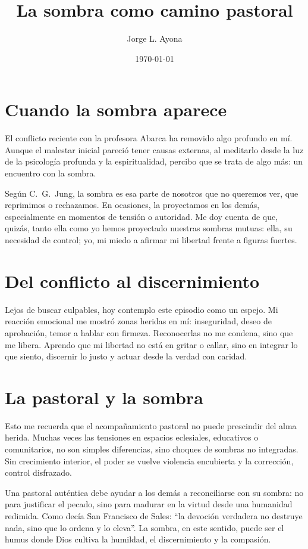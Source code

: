 \documentclass[12pt]{article}
\title{La sombra como camino pastoral}
\author{Jorge L. Ayona}
\date{\today}
\begin{document}
\maketitle

\section*{Cuando la sombra aparece}

El conflicto reciente con la profesora Abarca ha removido algo profundo en mí. Aunque el malestar inicial pareció tener causas externas, al meditarlo desde la luz de la psicología profunda y la espiritualidad, percibo que se trata de algo más: un encuentro con la sombra.

Según C.~G.~Jung, la sombra es esa parte de nosotros que no queremos ver, que reprimimos o rechazamos. En ocasiones, la proyectamos en los demás, especialmente en momentos de tensión o autoridad. Me doy cuenta de que, quizás, tanto ella como yo hemos proyectado nuestras sombras mutuas: ella, su necesidad de control; yo, mi miedo a afirmar mi libertad frente a figuras fuertes.

\section*{Del conflicto al discernimiento}

Lejos de buscar culpables, hoy contemplo este episodio como un espejo. Mi reacción emocional me mostró zonas heridas en mí: inseguridad, deseo de aprobación, temor a hablar con firmeza. Reconocerlas no me condena, sino que me libera. Aprendo que mi libertad no está en gritar o callar, sino en integrar lo que siento, discernir lo justo y actuar desde la verdad con caridad.

\section*{La pastoral y la sombra}

Esto me recuerda que el acompañamiento pastoral no puede prescindir del alma herida. Muchas veces las tensiones en espacios eclesiales, educativos o comunitarios, no son simples diferencias, sino choques de sombras no integradas. Sin crecimiento interior, el poder se vuelve violencia encubierta y la corrección, control disfrazado.

Una pastoral auténtica debe ayudar a los demás a reconciliarse con su sombra: no para justificar el pecado, sino para madurar en la virtud desde una humanidad redimida. Como decía San Francisco de Sales: ``la devoción verdadera no destruye nada, sino que lo ordena y lo eleva''. La sombra, en este sentido, puede ser el humus donde Dios cultiva la humildad, el discernimiento y la compasión.
\end{document}
